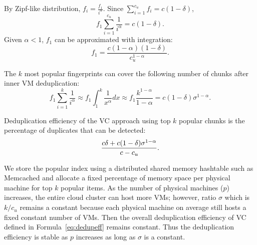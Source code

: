 By Zipf-like distribution, $f_i = \frac{f_1}{i^\alpha}.$
Since $ \sum_{i=1}^{c_u}f_i = c (1-\delta)$,
\[
f_1 \sum_{i=1}^{c_u}\frac{1}{i^\alpha} = c (1-\delta).
\]
Given $\alpha <1$, $f_1$ can be approximated with integration:
\begin{equation}
f_1=\frac{c(1-\alpha)(1-\delta)}{c_u^{1-\alpha}}.
\end{equation}

The  $k$ most popular fingerprints can cover the following number of chunks after inner VM 
deduplication:
\[
f_1 \sum_{i=1}^{k}\frac{1}{i^\alpha} \approx  
f_1 \int_{1}^{k}\frac{1}{x^\alpha} dx  \approx  f_1\frac{  k^{1-\alpha}} {1-\alpha}
=c(1-\delta) \sigma^{1-\alpha}.
\]

Deduplication efficiency of the VC approach using top $k$ popular chunks
is the percentage of duplicates that can be detected:  
\begin{equation}
\label{eq:dedupeff}
\frac{ c\delta + c(1-\delta) \sigma^{1-\alpha}}
{c  - c_u }.\\
\end{equation}

We store the popular index using a distributed shared memory hashtable such as Memcached
and allocate a fixed percentage of memory space   per physical machine for top $k$ popular items.
As the number of physical machines ($p$) increases,
the entire cloud cluster can host more VMs; however,  ratio $\sigma$ which is $k/c_u$ remains
a constant because each physical machine on average still hosts a fixed constant number of 
VMs. Then the overall deduplication efficiency of VC defined in Formula~\ref{eq:dedupeff}
remains constant.
Thus the deduplication efficiency is stable  as $p$ increases as long as $\sigma$  is a constant.


